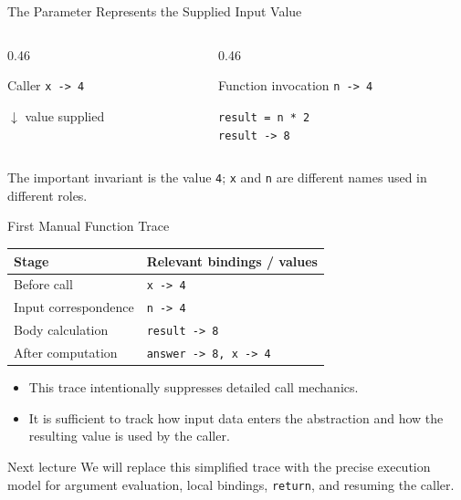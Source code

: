 \documentclass[aspectratio=169,10pt]{beamer}
\begin{document}
\begin{frame}{The Parameter Represents the Supplied Input Value}
  \begin{columns}[T,onlytextwidth]
    \begin{column}{0.46\textwidth}
      \begin{block}{Caller}
        \texttt{x -> 4}
      \end{block}
      \begin{center}
        \Large $\downarrow$ value supplied
      \end{center}
    \end{column}

    \begin{column}{0.46\textwidth}
      \begin{block}{Function invocation}
        \texttt{n -> 4}
      \end{block}
      \begin{center}
        \texttt{result = n * 2}\\
        \texttt{result -> 8}
      \end{center}
    \end{column}
  \end{columns}

  \begin{keyidea}
    The important invariant is the value \texttt{4}; \texttt{x} and \texttt{n} are different names used in different roles.
  \end{keyidea}
\end{frame}

\begin{frame}{First Manual Function Trace}
  \begin{center}
    \renewcommand{\arraystretch}{1.30}
    \begin{tabular}{l|l}
      \textbf{Stage} & \textbf{Relevant bindings / values} \\\hline
      Before call & \texttt{x -> 4} \\
      Input correspondence & \texttt{n -> 4} \\
      Body calculation & \texttt{result -> 8} \\
      After computation & \texttt{answer -> 8, x -> 4}
    \end{tabular}
  \end{center}

  \begin{itemize}
    \item This trace intentionally suppresses detailed call mechanics.
    \item It is sufficient to track how input data enters the abstraction and how the resulting value is used by the caller.
  \end{itemize}

  \begin{alertblock}{Next lecture}
    We will replace this simplified trace with the precise execution model for argument evaluation, local bindings, \texttt{return}, and resuming the caller.
  \end{alertblock}
\end{frame}
\end{document}
